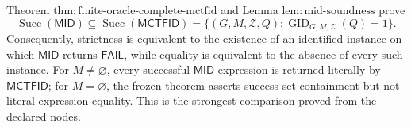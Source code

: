 Theorem \(\mathrm{thm:finite\text{-}oracle\text{-}complete\text{-}mctfid}\) and Lemma \(\mathrm{lem:mid\text{-}soundness}\) prove
\[
 \operatorname{Succ}(\mathsf{MID})
 \subseteq
 \operatorname{Succ}(\mathsf{MCTFID})
 =\{(G,M,\mathcal Z,Q):
 \operatorname{GID}_{G,M,\mathcal Z}(Q)=1\}.
\]
Consequently, strictness is equivalent to the existence of an identified instance on which \(\mathsf{MID}\) returns \(\mathsf{FAIL}\), while equality is equivalent to the absence of every such instance. For \(M\ne\varnothing\), every successful \(\mathsf{MID}\) expression is returned literally by \(\mathsf{MCTFID}\); for \(M=\varnothing\), the frozen theorem asserts success-set containment but not literal expression equality. This is the strongest comparison proved from the declared nodes.